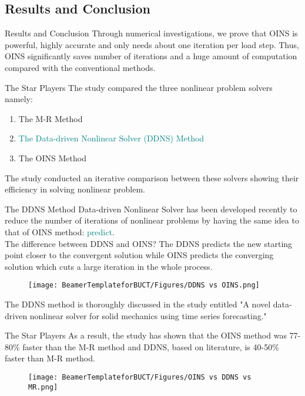 \documentclass[
10pt,
aspectratio=169,
]{beamer}
\begin{document}
\subsection{Results and Conclusion}
\begin{frame}{Results and Conclusion}
    Through numerical investigations, we prove that OINS is powerful, highly accurate and only needs about one iteration per load step. Thus, OINS significantly saves number of iterations and a huge amount of computation compared with the conventional methods.
\end{frame}
\begin{frame}{The Star Players}
    The study compared the three nonlinear problem solvers namely:
    \begin{enumerate}
        \item The M-R Method
        \item \textcolor{teal}{The Data-driven Nonlinear Solver (DDNS) Method}
        \item The OINS Method
    \end{enumerate}
    The study conducted an iterative comparison between these solvers showing their efficiency in solving nonlinear problem. 
\end{frame}
\begin{frame}{The DDNS Method}
    Data-driven Nonlinear Solver has been developed recently to reduce the number of iterations of nonlinear problems by having the same idea to that of OINS method: \textcolor{teal}{predict}. \pause \\
    The difference between DDNS and OINS? The DDNS predicts the new starting point closer to the convergent solution while OINS predicts the converging solution which cuts a large iteration in the whole process.
    \begin{figure}
        \centering
        \texttt{[image: BeamerTemplateforBUCT/Figures/DDNS vs OINS.png]}
        \label{fig:enter-label}
    \end{figure}

    The DDNS method is thoroughly discussed in the study entitled "A novel data-driven nonlinear solver for solid mechanics using time series forecasting."
\end{frame}
\begin{frame}{The Star Players}
    As a result, the study has shown that the OINS method was 77-80\% faster than the M-R method and DDNS, based on literature, is 40-50\% faster than M-R method.

    \begin{figure}
        \centering
        \texttt{[image: BeamerTemplateforBUCT/Figures/OINS vs DDNS vs MR.png]}
        \label{fig:enter-label}
    \end{figure}
\end{frame}
\end{document}
